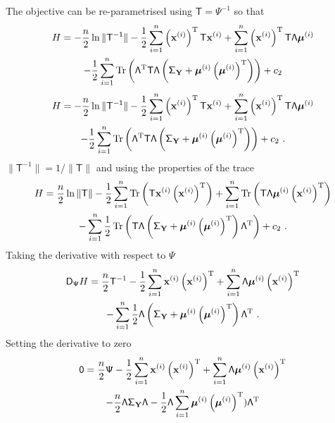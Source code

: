 \documentclass[12pt]{report}
\DeclareMathOperator{\trace}{Tr}
\newcommand{\T}{^\textup{T}}
\newcommand{\vect}[1]{\mathbf{#1}}
\newcommand{\vectGreek}[1]{\boldsymbol{#1}}
\newcommand{\matr}[1]{\mathsf{#1}}
\begin{document}
The objective can be re-parametrised using $\matr{T}=\matr{\Psi}^{-1}$ so that
\begin{multline*}
H = -\frac{n}{2}
\ln\|\matr{T^{-1}}\|
-\frac{1}{2}\sum_{i=1}^{n}\left(\vect{x}^{(i)}\right)\T\matr{T}\vect{x}^{(i)}
+\sum_{i=1}^{n}\left(\vect{x}^{(i)}\right)\T\matr{T}\matr{\Lambda}\vectGreek{\mu}^{(i)}\\
-\frac{1}{2}\sum_{i=1}^{n}\trace\left(\matr{\Lambda}\T\matr{T}\matr{\Lambda}\left(\matr{\Sigma}_{\vect{Y}}+\vectGreek{\mu}^{(i)}\left(\vectGreek{\mu}^{(i)}\right)\T\right)\right)
+c_2
\end{multline*}
\begin{multline*}
H = -\frac{n}{2}
\ln\|\matr{T^{-1}}\|
-\frac{1}{2}\sum_{i=1}^{n}\left(\vect{x}^{(i)}\right)\T\matr{T}\vect{x}^{(i)}
+\sum_{i=1}^{n}\left(\vect{x}^{(i)}\right)\T\matr{T}\matr{\Lambda}\vectGreek{\mu}^{(i)}\\
-\frac{1}{2}\sum_{i=1}^{n}\trace\left(\matr{\Lambda}\T\matr{T}\matr{\Lambda}\left(\matr{\Sigma}_{\vect{Y}}+\vectGreek{\mu}^{(i)}\left(\vectGreek{\mu}^{(i)}\right)\T\right)\right)
+c_2 \ .
\end{multline*}
$\|\matr{T}^{-1}\| = 1/\|\matr{T}\|$ and using the properties of the trace
\begin{multline*}
H = \frac{n}{2}
\ln\|\matr{T}\|
-\frac{1}{2}\sum_{i=1}^{n}\trace\left(\matr{T}\vect{x}^{(i)}\left(\vect{x}^{(i)}\right)\T\right)
+\sum_{i=1}^{n}\trace\left(\matr{T}\matr{\Lambda}\vectGreek{\mu}^{(i)}\left(\vect{x}^{(i)}\right)\T\right)\\
-\sum_{i=1}^{n}\frac{1}{2}\trace\left(\matr{T}\matr{\Lambda}\left(\matr{\Sigma}_{\vect{Y}}+\vectGreek{\mu}^{(i)}\left(\vectGreek{\mu}^{(i)}\right)\T\right)\matr{\Lambda}\T\right)
+c_2 \ .
\end{multline*}
Taking the derivative with respect to $\matr{\Psi}$
\begin{multline*}
\matr{D}_{\matr{\Psi}}H = \frac{n}{2}\matr{T}^{-1}
-\frac{1}{2}\sum_{i=1}^{n}\vect{x}^{(i)}\left(\vect{x}^{(i)}\right)\T
+\sum_{i=1}^{n}\matr{\Lambda}\vectGreek{\mu}^{(i)}\left(\vect{x}^{(i)}\right)\T\\
-\sum_{i=1}^{n}\frac{1}{2}\matr{\Lambda}\left(\matr{\Sigma}_{\vect{Y}}+\vectGreek{\mu}^{(i)}\left(\vectGreek{\mu}^{(i)}\right)\T\right)\matr{\Lambda}\T \ .
\end{multline*}
Setting the derivative to zero
\begin{multline*}
\matr{0} = \frac{n}{2}\matr{\Psi}
-\frac{1}{2}\sum_{i=1}^{n}\vect{x}^{(i)}\left(\vect{x}^{(i)}\right)\T
+\sum_{i=1}^{n}\matr{\Lambda}\vectGreek{\mu}^{(i)}\left(\vect{x}^{(i)}\right)\T\\
-\frac{n}{2}\matr{\Lambda}\matr{\Sigma}_{\vect{Y}}\matr{\Lambda}-\frac{1}{2}\matr{\Lambda}\sum_{i=1}^{n}\vectGreek{\mu}^{(i)}\left(\vectGreek{\mu}^{(i)}\right)\T)\matr{\Lambda}\T
\end{multline*}
\end{document}
